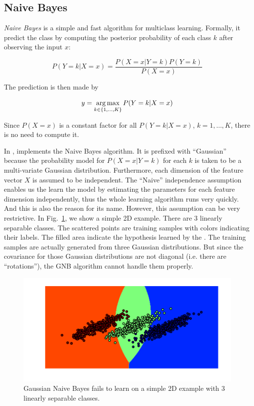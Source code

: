 \subsection{Naive Bayes}
\emph{Naive Bayes} is a simple and fast algorithm for multiclass learning.
Formally, it predict the class by computing the posterior probability of each
class $k$ after observing the input $x$:

\[
	P\left( Y=k | X = x \right) = \frac{P(X=x|Y=k)P(Y=k)}{P(X=x)}
\]

The prediction is then made by

\[
	y = \operatorname*{arg\,max}_{k\in\{1,\ldots,K\}} P(Y=k|X=x)
\]

Since $P(X=x)$ is a constant factor for all $P(Y=k|X=x)$, $k=1,\ldots,K$, there
is no need to compute it.

In \shogun{},  implements the Naive Bayes
algorithm. It is prefixed with ``Gaussian'' because the probability model for
$P(X=x|Y=k)$ for each $k$ is taken to be a multi-variate Gaussian distribution.
Furthermore, each dimension of the feature vector $X$ is assumed to be
independent. The ``Naive'' independence assumption enables us the learn the
model by estimating the parameters for each feature dimension independently,
thus the whole learning algorithm runs very quickly. And this is also the 
reason for its name. However, this assumption can be very restrictive. In
Fig.~\ref{fig:mc-gnb-fail}, we show a simple 2D example. There are 3 linearly
separable classes. The scattered points are training samples with colors
indicating their labels. The filled area indicate the hypothesis learned by
the . The training samples are actually
generated from three Gaussian distributions. But since the covariance for those
Gaussian distributions are not diagonal (i.e. there are ``rotations''), the GNB
algorithm cannot handle them properly.

\begin{figure}
    \centering\includegraphics{fig/multiclass/gnb-fail-case}
    \caption{Gaussian Naive Bayes fails to learn on a simple 2D example with 3
    linearly separable classes.}
    \label{fig:mc-gnb-fail}
\end{figure}

